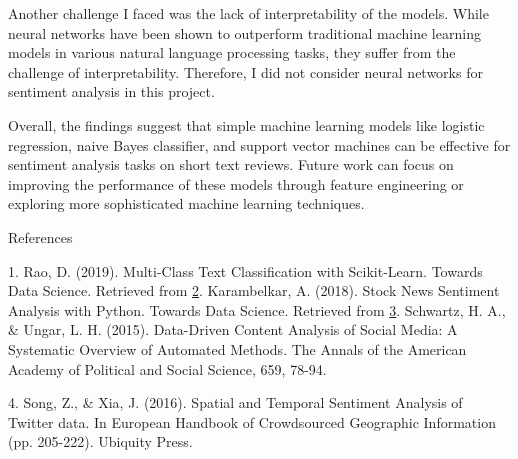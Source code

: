 \documentclass{article}
\begin{document}
Another challenge I faced was the lack of interpretability of the models. While neural networks have been shown to outperform traditional machine learning models in various natural language processing tasks, they suffer from the challenge of interpretability. Therefore, I did not consider neural networks for sentiment analysis in this project.

Overall, the findings suggest that simple machine learning models like logistic regression, naive Bayes classifier, and support vector machines can be effective for sentiment analysis tasks on short text reviews. Future work can focus on improving the performance of these models through feature engineering or exploring more sophisticated machine learning techniques.

\newpage
\pagebreak[]

References

1. Rao, D. (2019). Multi-Class Text Classification with Scikit-Learn. Towards Data Science. Retrieved from \href{https://towardsdatascience.com/multi-class-text-classification-with-scikit-learn-12f1e60e0a9f.}

2. Karambelkar, A. (2018). Stock News Sentiment Analysis with Python. Towards Data Science. Retrieved from \href{https://towardsdatascience.com/stock-news-sentiment-analysis-with-python-193d4b4378d4 }

3. Schwartz, H. A., & Ungar, L. H. (2015). Data-Driven Content Analysis of Social Media: A Systematic Overview of Automated Methods. The Annals of the American Academy of Political and Social Science, 659, 78-94. 

4. Song, Z., & Xia, J. (2016). Spatial and Temporal Sentiment Analysis of Twitter data. In European Handbook of Crowdsourced Geographic Information (pp. 205-222). Ubiquity Press. 
\end{document}
